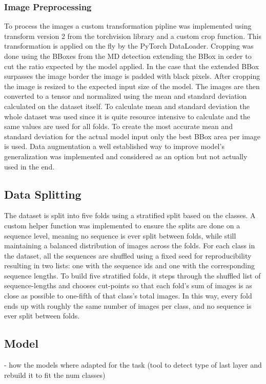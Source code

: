         \subsubsection{Image Preprocessing}
        To process the images a custom transformation pipline was implemented using transform version 2 from the torchvision library and a custom crop function.
        This transformation is applied on the fly by the PyTorch DataLoader.
        Cropping was done using the BBoxes from the MD detection extending the BBox in order to cut the ratio expected by the model applied.
        In the case that the extended BBox surpasses the image border the image is padded with black pixels.
        After cropping the image is resized to the expected input size of the model.
        The images are then converted to a tensor and normalized using the mean and standard deviation calculated on the dataset itself.
        To calculate mean and standard deviation the whole dataset was used since it is quite resource intensive to calculate and the same values are used for all folds.
        To create the most accurate mean and standard deviation for the actual model input only the best BBox area per image is used.
        Data augmentation a well established way to improve model's generalization \autocite{shortenSurveyImageData2019} was implemented and considered as an option but not actually used in the end.

    \subsection{Data Splitting}

    The dataset is split into five folds using a stratified split based on the classes.
    A custom helper function was implemented to ensure the splits are done on a sequence level, meaning no sequence is ever split between folds, while still maintaining a balanced distribution of images across the folds.
    For each class in the dataset, all the sequences are shuffled using a fixed seed for reproducibility resulting in two lists: one with the sequence ids and one with the corresponding sequence lengths.
    To build five stratified folds, it steps through the shuffled list of sequence-lengths and chooses cut-points so that each fold's sum of images is as close as possible to one-fifth of that class's total images.
    In this way, every fold ends up with roughly the same number of images per class, and no sequence is ever split between folds.

    \subsection{Model}
    - how the models where adapted for the task (tool to detect type of last layer and rebuild it to fit the num classes)

